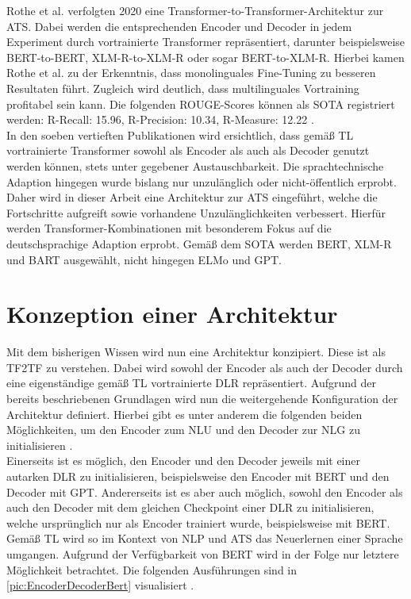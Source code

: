 \noindent
Rothe et al. verfolgten 2020 eine Transformer-to-Transformer-Architektur zur \ac{ATS}. Dabei werden die entsprechenden Encoder und Decoder in jedem Experiment durch vortrainierte Transformer repräsentiert, darunter beispielsweise \ac{BERT}-to-\ac{BERT}, \ac{XLM-R}-to-\ac{XLM-R} oder sogar \ac{BERT}-to-\ac{XLM-R}. Hierbei kamen Rothe et al. zu der Erkenntnis, dass monolinguales Fine-Tuning zu besseren Resultaten führt. Zugleich wird deutlich, dass multilinguales Vortraining profitabel sein kann. Die folgenden \ac{ROUGE}-Scores können als \ac{SOTA} registriert werden: R-Recall: 15.96, R-Precision: 10.34, R-Measure: 12.22 \cite{ROT20}.\\

\noindent
In den soeben vertieften Publikationen wird ersichtlich, dass gemäß \ac{TL} vortrainierte Transformer sowohl als Encoder als auch als Decoder genutzt werden können, stets unter gegebener Austauschbarkeit. Die sprachtechnische Adaption hingegen wurde bislang nur unzulänglich oder nicht-öffentlich erprobt. Daher wird in dieser Arbeit eine Architektur zur \ac{ATS} eingeführt, welche die Fortschritte aufgreift sowie vorhandene Unzulänglichkeiten verbessert. Hierfür werden Transformer-Kombinationen mit besonderem Fokus auf die deutschsprachige Adaption erprobt. Gemäß dem \ac{SOTA} werden \ac{BERT}, \ac{XLM-R} und \ac{BART} ausgewählt, nicht hingegen \ac{ELMo} und \ac{GPT}.


\section{Konzeption einer Architektur}
\noindent
Mit dem bisherigen Wissen wird nun eine Architektur konzipiert. Diese ist als \ac{TF2TF} zu verstehen. Dabei wird sowohl der Encoder als auch der Decoder durch eine eigenständige gemäß \ac{TL} vortrainierte \ac{DLR} repräsentiert. Aufgrund der bereits beschriebenen Grundlagen wird nun die weitergehende Konfiguration der Architektur definiert. Hierbei gibt es unter anderem die folgenden beiden Möglichkeiten, um den Encoder zum \ac{NLU} und den Decoder zur \ac{NLG} zu initialisieren \cite[S.~2]{ROT20}.\\

\noindent
Einerseits ist es möglich, den Encoder und den Decoder jeweils mit einer autarken \ac{DLR} zu initialisieren, beispielsweise den Encoder mit \ac{BERT} und den Decoder mit \ac{GPT}. Andererseits ist es aber auch möglich, sowohl den Encoder als auch den Decoder mit dem gleichen Checkpoint einer \ac{DLR} zu initialisieren, welche ursprünglich nur als Encoder trainiert wurde, beispielsweise mit \ac{BERT}. Gemäß \ac{TL} wird so im Kontext von \ac{NLP} und \ac{ATS} das Neuerlernen einer Sprache umgangen. Aufgrund der Verfügbarkeit von \ac{BERT} wird in der Folge nur letztere Möglichkeit betrachtet. Die folgenden Ausführungen sind in \autoref{pic:EncoderDecoderBert} visualisiert \cite[S.~2-3]{ROT20}.\\

